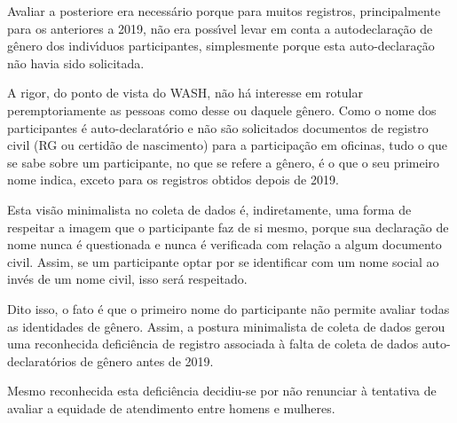 \documentclass[
12pt,		%
openright,	%
twoside,  %
a4paper,			%
chapter=TITLE,		%
english,			%
french,				%
spanish,			%
brazil				%
]{USPSC-classe/USPSC}
\begin{document}
Avaliar a posteriore era necess\'ario porque para muitos registros, principalmente para os anteriores a 2019, n\~ao era poss\'{\i}vel levar em conta a autodeclara\c{c}\~ao de g\^enero dos indiv\'{\i}duos participantes, simplesmente porque esta auto-declara\c{c}\~ao n\~ao havia sido solicitada.










A rigor, do ponto de vista do WASH, n\~ao h\'a interesse em rotular peremptoriamente as pessoas como desse ou daquele g\^enero. Como o nome dos participantes \'e auto-declarat\'orio e n\~ao s\~ao solicitados documentos de registro civil (RG ou certid\~ao de nascimento) para a participa\c{c}\~ao em oficinas, tudo o que se sabe sobre um participante, no que se refere a g\^enero, \'e o que o seu primeiro nome indica, exceto para os registros obtidos depois de 2019.










Esta vis\~ao minimalista no coleta de dados \'e, indiretamente, uma forma de respeitar a imagem que o participante faz de si mesmo, porque sua declara\c{c}\~ao de nome nunca \'e questionada e nunca \'e verificada com rela\c{c}\~ao a algum documento civil. Assim, se um participante optar por se identificar com um nome social ao inv\'es de um nome civil, isso ser\'a respeitado.










Dito isso, o fato \'e que o primeiro nome do participante n\~ao permite avaliar todas as identidades de g\^enero. Assim, a postura minimalista de coleta de dados gerou uma reconhecida defici\^encia de registro associada \`a falta de coleta de dados auto-declarat\'orios de g\^enero antes de 2019.










Mesmo reconhecida esta defici\^encia decidiu-se por n\~ao renunciar \`a tentativa de avaliar a equidade de atendimento entre homens e mulheres.
\end{document}
